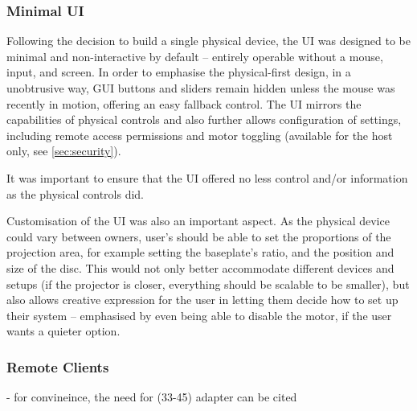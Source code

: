             \subsubsection{Minimal UI}
    
            Following the decision to build a single physical device, the UI was designed to be minimal and non-interactive by default -- entirely operable without a mouse, input, and screen. In order to emphasise the physical-first design, in a unobtrusive way, GUI buttons and sliders remain hidden unless the mouse was recently in motion, offering an easy fallback control. The UI mirrors the capabilities of physical controls and also further allows configuration of settings, including remote access permissions and motor toggling (available for the host only, see \ref{sec:security}).
    
            It was important to ensure that the UI offered no less control and/or information as the physical controls did.
    
            Customisation of the UI was also an important aspect. As the physical device could vary between owners, user's should be able to set the proportions of the projection area, for example setting the baseplate's ratio, and the position and size of the disc. This would not only better accommodate different devices and setups (if the projector is closer, everything should be scalable to be smaller), but also allows creative expression for the user in letting them decide how to set up their system -- emphasised by even being able to disable the motor, if the user wants a quieter option.
        
            \subsubsection{Remote Clients}
    
                \begin{temp}
                    - for convineince, the need for (33-45) adapter  can be cited
                \end{temp}
    
